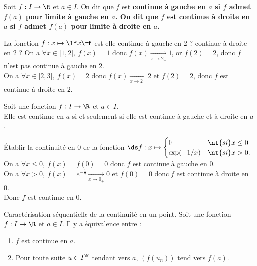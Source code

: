 \documentclass[11pt]{article}
\begin{document}
\begin{defi}{}{}
    Soit $f:I\to\R$ et $a\in I$. On dit que $f$ est \bf{continue à gauche en $a$} si $f$ admet $f(a)$ pour limite à gauche en $a$. On dit que $f$ est \bf{continue à droite en $a$} si $f$ admet $f(a)$ pour limite à droite en $a$. 
\end{defi}

\begin{ex}{}{}
    La fonction $f:x\mapsto\lf x\rf$ est-elle continue à gauche en $2$ ? continue à droite en $2$ ?
    \tcblower
    On a $\forall x \in [1,2[, ~ f(x)=1$ donc $f(x)\xrightarrow[x\to2_-]{}1$, or $f(2)=2$, donc $f$ n'est pas continue à gauche en $2$.\\
    On a $\forall x \in [2,3[, ~ f(x)=2$ donc $f(x)\xrightarrow[x\to2_+]{}2$ et $f(2)=2$, donc $f$ est continue à droite en $2$.
\end{ex}

\begin{prop}{}{}
    Soit une fonction $f:I\to\R$ et $a\in I$.\\
    Elle est continue en $a$ si et seulement si elle est continue à gauche et à droite en $a$.
\end{prop}

\begin{ex}{}{}
    Établir la continuité en 0 de la fonction $\ds f:x\mapsto \begin{cases}
        0 &\nt{si } x\leq 0\\
        \exp(-1/x) &\nt{si } x>0. 
    \end{cases}$
    \tcblower
    On a $\forall x \leq 0, ~ f(x)=f(0)=0$ donc $f$ est continue à gauche en 0.\\
    On a $\forall x>0, ~ f(x)=e^{-\frac{1}{x}}\xrightarrow[x\to0_+]{}0$ et $f(0)=0$ donc $f$ est continue à droite en 0.\\
    Donc $f$ est continue en 0.
\end{ex}

\begin{prop}{Caractérisation séquentielle de la continuité en un point.}{}
    Soit une fonction $f:I\to\R$ et $a\in I$. Il y a équivalence entre :
    \begin{enumerate}
        \item $f$ est continue en $a$.
        \item Pour toute suite $u\in I^\N$ tendant vers $a$, $(f(u_n))$ tend vers $f(a)$.
    \end{enumerate}
\end{prop}
\end{document}

